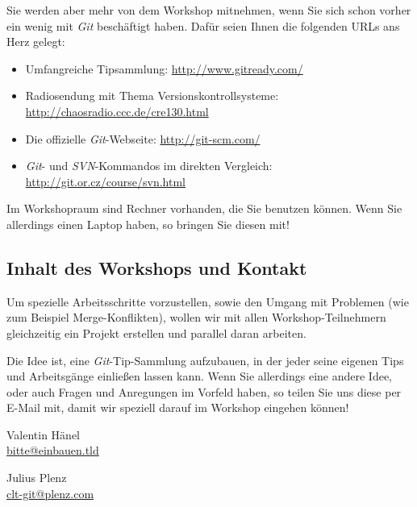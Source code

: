\documentclass[11pt,            %
               a4paper,         %
               oneside,         %
               DIV12,           %
               fleqn,           %
               smallheadings,   %
               halfparskip,     %
               nochapterprefix, %
               bibtotocnumbered,%
              ]{scrartcl} %
\begin{document}
Sie werden aber mehr von dem Workshop mitnehmen, wenn Sie sich schon
vorher ein wenig mit \emph{Git} beschäftigt haben. Dafür seien Ihnen
die folgenden URLs ans Herz gelegt:

\begin{itemize}
\item Umfangreiche Tipsammlung:
  \url{http://www.gitready.com/}
\item Radiosendung mit Thema Versionskontrollsysteme:\\
  \url{http://chaosradio.ccc.de/cre130.html}
\item Die offizielle \emph{Git}-Webseite:
  \url{http://git-scm.com/}
\item \emph{Git}- und \emph{SVN}-Kommandos im direkten Vergleich:\\
  \url{http://git.or.cz/course/svn.html}
\end{itemize}

Im Workshopraum sind Rechner vorhanden, die Sie benutzen können. Wenn
Sie allerdings einen Laptop haben, so bringen Sie diesen mit!

\subsection*{Inhalt des Workshops und Kontakt}

Um spezielle Arbeitsschritte vorzustellen, sowie den Umgang mit
Problemen (wie zum Beispiel Merge-Konflikten), wollen wir mit allen
Workshop-Teilnehmern gleichzeitig ein Projekt erstellen und parallel
daran arbeiten.

Die Idee ist, eine \emph{Git}-Tip-Sammlung aufzubauen, in der jeder
seine eigenen Tips und Arbeitsgänge einließen lassen kann.
Wenn Sie allerdings eine andere Idee, oder auch Fragen und Anregungen
im Vorfeld haben, so teilen Sie uns diese per E-Mail mit, damit wir
speziell darauf im Workshop eingehen können!

\hfill
\begin{minipage}{5cm}
\begin{center}
Valentin Hänel\\
\url{bitte@einbauen.tld}
\end{center}
\end{minipage}
\hfill
\begin{minipage}{5cm}
\begin{center}
Julius Plenz\\
\url{clt-git@plenz.com}
\end{center}
\end{minipage}
\hfill\\







%
%
\end{document}
